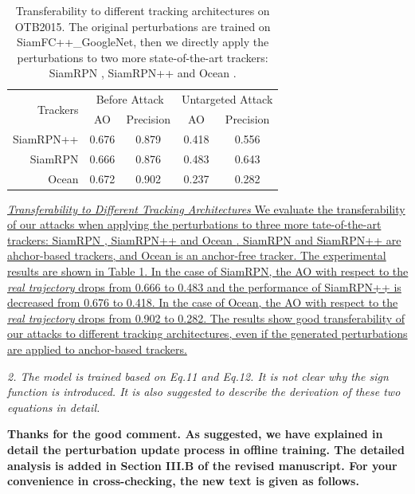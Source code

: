 \documentclass[12pt]{article}
\begin{document}
\begin{table}[t]
  \renewcommand\thetable{XIII}
  \centering
  \caption{Transferability to different tracking architectures on OTB2015. The original perturbations are trained on SiamFC++\_GoogleNet, then we directly apply the perturbations to two more state-of-the-art trackers: SiamRPN \cite{SiamRPN}, SiamRPN++ \cite{SiamRPN++} and Ocean \cite{zhang2020ocean}.}
  \begin{tabular}{rcccc} 
  \toprule
  \multirow{2}{*}[-2pt]{Trackers} & \multicolumn{2}{c}{Before Attack} & \multicolumn{2}{c}{Untargeted Attack}  \\
  \cmidrule{2-5}
                            & AO & Precision              & AO    & Precision \\ \midrule
  SiamRPN++                 & 0.676   & 0.879             & 0.418 & 0.556     \\
  SiamRPN                   & 0.666   & 0.876             & 0.483 & 0.643     \\
  Ocean                     & 0.672   & 0.902             & 0.237 & 0.282     \\ \bottomrule
  \end{tabular}
  \label{tab:arch}
\end{table}
\uline{\textit{Transferability to Different Tracking Architectures} We evaluate the transferability of our attacks when applying the perturbations to three more tate-of-the-art trackers: SiamRPN \cite{SiamRPN}, SiamRPN++ \cite{SiamRPN++} and Ocean \cite{zhang2020ocean}. SiamRPN and SiamRPN++ are ahchor-based trackers, and Ocean is an anchor-free tracker. The experimental results are shown in Table \ref{tab:arch}. In the case of SiamRPN, the AO with respect to the \textit{real trajectory} drops from 0.666 to 0.483 and the performance of SiamRPN++ is decreased from 0.676 to 0.418. In the case of Ocean, the AO with respect to the \textit{real trajectory} drops from 0.902 to 0.282. The results show good transferability of our attacks to different tracking architectures, even if the generated perturbations are applied to anchor-based trackers.
}

\textit{2. The model is trained based on Eq.11 and Eq.12. It is not clear why the sign function is introduced. It is also suggested to describe the derivation of these two equations in detail.}

\textbf{Thanks for the good comment. As suggested, we have explained in detail the perturbation update process in offline training.
The detailed analysis is added in Section III.B of the revised manuscript.
For your convenience in cross-checking, the new text is given as follows.}
\end{document}
